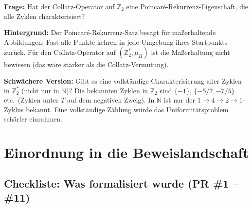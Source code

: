 \documentclass[12pt,a4paper]{article}
\newcommand{\N}{\mathbb{N}}
\newcommand{\Z}{\mathbb{Z}}
\newcommand{\Ztwo}{\mathbb{Z}_2}
\begin{document}
\begin{tcolorbox}[forschung, title={Forschungsfrage 3: Poincaré-Rekurrenz für Collatz auf $\Ztwo$}]
\textbf{Frage:} Hat der Collatz-Operator auf $\Ztwo$ eine Poincaré-Rekurrenz-Eigenschaft,
die alle Zyklen charakterisiert?

\medskip
\textbf{Hintergrund:} Der Poincaré-Rekurrenz-Satz besagt für maßerhaltende
Abbildungen: Fast alle Punkte kehren in jede Umgebung ihres Startpunkts
zurück. Für den Collatz-Operator auf $(\Ztwo^*, \mu_H)$ ist die Maßerhaltung
nicht bewiesen (das wäre stärker als die Collatz-Vermutung).

\medskip
\textbf{Schwächere Version:} Gibt es eine vollständige Charakterisierung
aller Zyklen in $\Ztwo^*$ (nicht nur in $\N$)? Die bekannten Zyklen
in $\Z_2$ sind $\{-1\}$, $\{-5/7, -7/5\}$ etc.\ (Zyklen unter
$T$ auf dem negativen Zweig). In $\N$ ist nur der $1 \to 4 \to 2 \to 1$-Zyklus
bekannt. Eine vollständige Zählung würde das Uniformitätsproblem schärfer
einrahmen.
\end{tcolorbox}

\section{Einordnung in die Beweislandschaft}
\label{sec:einordnung}

\subsection{Checkliste: Was formalisiert wurde (PR \#1 -- \#11)}
\end{document}
